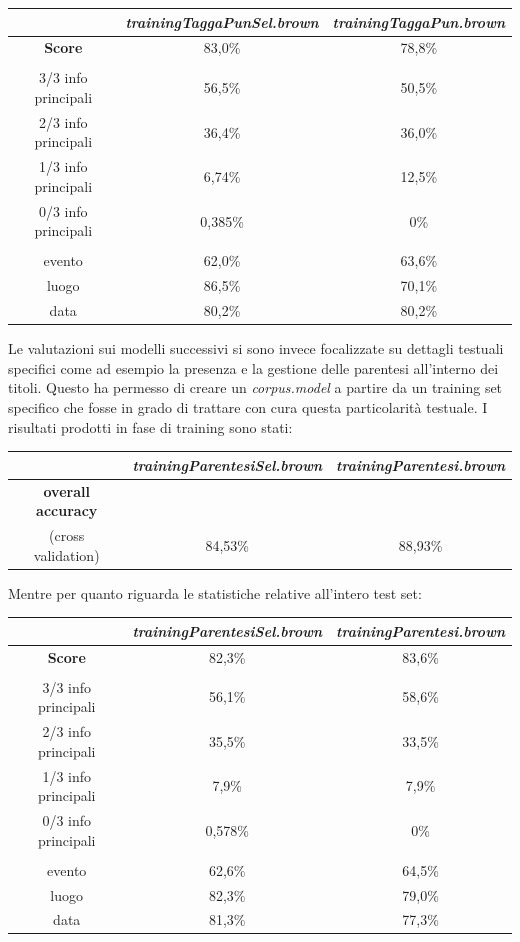 \documentclass[a4paper]{report}
\begin{document}
\begin{center}
\begin{tabular}{|ccc|}
\hline
 & \textit{trainingTaggaPunSel.brown} & \textit{trainingTaggaPun.brown}\\
\hline
\textbf{Score} & 83,0\% & 78,8\% \\
\hline
 & &  \\
\hline
3/3 info principali & 56,5\% & 50,5\% \\
2/3 info principali & 36,4\% & 36,0\% \\
1/3 info principali & 6,74\% & 12,5\% \\
0/3 info principali & 0,385\% & 0\% \\
\hline
 & &  \\
\hline
evento & 62,0\% & 63,6\% \\
luogo & 86,5\% & 70,1\% \\
data & 80,2\% & 80,2\% \\
\hline
\end{tabular}
\end{center}
Le valutazioni sui modelli successivi si sono invece focalizzate su dettagli testuali specifici come ad esempio la presenza e la gestione delle parentesi all'interno dei titoli. Questo ha permesso di creare un \textit{corpus.model} a partire da un training set specifico che fosse in grado di trattare con cura questa particolarità testuale. I risultati prodotti in fase di training sono stati: 
\begin{center}
\begin{tabular}{c c c}
\hline
 & \textit{trainingParentesiSel.brown} & \textit{trainingParentesi.brown}\\
\hline
\textbf{overall accuracy} \\ (cross validation) & 84,53\% & 88,93\% \\
\hline
\end{tabular}
\end{center}
Mentre per quanto riguarda le statistiche relative all'intero test set:
\begin{center}
\begin{tabular}{|ccc|}
\hline
 & \textit{trainingParentesiSel.brown} & \textit{trainingParentesi.brown}\\
\hline
\textbf{Score} & 82,3\% & 83,6\% \\
\hline
 & &  \\
\hline
3/3 info principali & 56,1\% & 58,6\% \\
2/3 info principali & 35,5\% & 33,5\% \\
1/3 info principali & 7,9\% & 7,9\% \\
0/3 info principali & 0,578\% & 0\% \\
\hline
 & &  \\
\hline
evento & 62,6\% & 64,5\% \\
luogo & 82,3\% & 79,0\% \\
data & 81,3\% & 77,3\% \\
\hline
\end{tabular}
\end{center}
\end{document}
